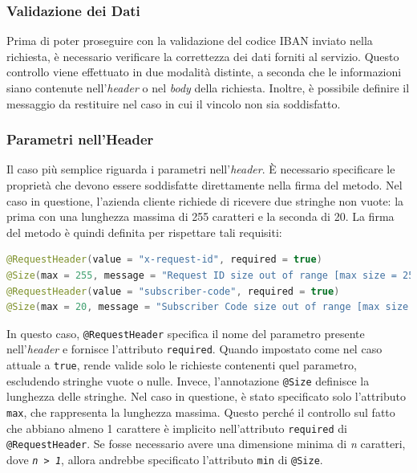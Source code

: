 \subsubsection{Validazione dei Dati}

Prima di poter proseguire con la validazione del codice IBAN inviato nella richiesta, è necessario verificare la correttezza dei dati forniti al servizio. Questo controllo viene effettuato in due modalità distinte, a seconda che le informazioni siano contenute nell’\textit{header} o nel \textit{body} della richiesta. Inoltre, è possibile definire il messaggio da restituire nel caso in cui il vincolo non sia soddisfatto.

\subsubsection{Parametri nell’Header}

Il caso più semplice riguarda i parametri nell’\textit{header}. È necessario specificare le proprietà che devono essere soddisfatte direttamente nella firma del metodo. Nel caso in questione, l’azienda cliente richiede di ricevere due stringhe non vuote: la prima con una lunghezza massima di 255 caratteri e la seconda di 20. La firma del metodo è quindi definita per rispettare tali requisiti:
\begin{lstlisting}[language=Java, caption=Dichiarazione dei parametri all'interno della firma del metodo.]
@RequestHeader(value = "x-request-id", required = true)
@Size(max = 255, message = "Request ID size out of range [max size = 255]") String requestId,
@RequestHeader(value = "subscriber-code", required = true)
@Size(max = 20, message = "Subscriber Code size out of range [max size = 20]") String subscriberCode
\end{lstlisting}
In questo caso, \texttt{@RequestHeader} specifica il nome del parametro presente nell’\textit{header} e fornisce l’attributo \texttt{required}. Quando impostato come nel caso attuale a \texttt{true}, rende valide solo le richieste contenenti quel parametro, escludendo stringhe vuote o nulle. Invece, l’annotazione \texttt{@Size} definisce la lunghezza delle stringhe. Nel caso in questione, è stato specificato solo l’attributo \texttt{max}, che rappresenta la lunghezza massima. Questo perché il controllo sul fatto che abbiano almeno 1 carattere è implicito nell’attributo \texttt{required} di \texttt{@RequestHeader}. Se fosse necessario avere una dimensione minima di \textit{n} caratteri, dove \textit{\texttt{n > 1}}, allora andrebbe specificato l’attributo \texttt{min} di \texttt{@Size}.

